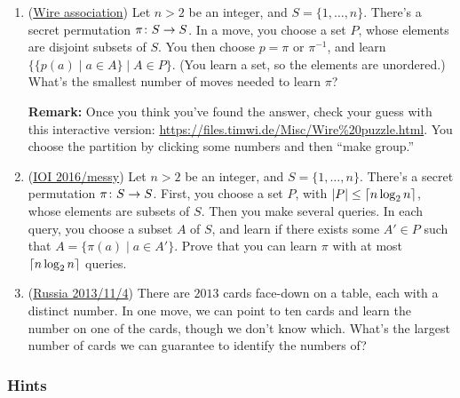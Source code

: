 \documentclass[11pt,paper=letter]{scrartcl}
\begin{document}
\begin{enumerate}[resume]
\item (\href{https://steamcommunity.com/sharedfiles/filedetails/?id=2509179914}{Wire association}) Let $n > 2$ be an integer, and $S = \{1, \ldots, n\}$. There's a secret permutation $\pi \colon S \to S$. In a move, you choose a set $P$, whose elements are disjoint subsets of $S$. You then choose $p = \pi$ or $\pi^{-1}$, and learn $\{\{p(a) \mid a \in A\} \mid A \in P\}$. (You learn a set, so the elements are unordered.) What's the smallest number of moves needed to learn $\pi$?
\hints{\ref{h:12} \ref{h:13}}

\textbf{Remark:} Once you think you've found the answer, check your guess with this interactive version: \url{https://files.timwi.de/Misc/Wire%20puzzle.html}. You choose the partition by clicking some numbers and then ``make group.''

\item (\href{https://oj.uz/problem/view/IOI16_messy}{IOI 2016/messy}) Let $n > 2$ be an integer, and $S = \{1, \ldots, n\}$. There's a secret permutation $\pi \colon S \to S$. First, you choose a set $P$, with $|P| \le \left\lceil n\log_2 n \right\rceil$, whose elements are subsets of $S$. Then you make several queries. In each query, you choose a subset $A$ of $S$, and learn if there exists some $A' \in P$ such that $A = \{\pi(a) \mid a \in A'\}$. Prove that you can learn $\pi$ with at most $\left\lceil n\log_2 n \right\rceil$ queries.
\hints{\ref{h:14} \ref{h:15}}

\item (\href{https://artofproblemsolving.com/community/c6h544046p3143005}{Russia 2013/11/4}) There are $2013$ cards face-down on a table, each with a distinct number. In one move, we can point to ten cards and learn the number on one of the cards, though we don't know which. What's the largest number of cards we can guarantee to identify the numbers of?
\hints{\ref{h:16} \ref{h:17} \ref{h:18}}

\end{enumerate}

\newpage

\subsubsection*{Hints}
\end{document}
